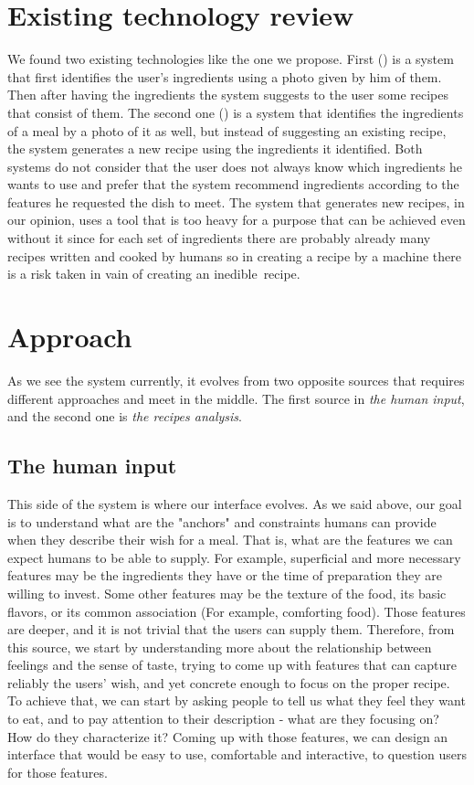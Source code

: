 \documentclass[]{article}
\begin{document}
\section{Existing technology review}
We found two existing technologies like the one we propose. First (\cite{1}) is a system that first identifies the user's ingredients using a photo given by him of them. Then after having the ingredients the system suggests to the user some recipes that consist of them. The second one (\cite{2}) is a system that identifies the ingredients of a meal by a photo of it as well, but instead of suggesting an existing recipe, the system generates a new recipe using the ingredients it identified. Both systems do not consider that the user does not always know which ingredients he wants to use and prefer that the system recommend ingredients according to the features he requested the dish to meet. The system that generates new recipes, in our opinion, uses a tool that is too heavy for a purpose that can be achieved even without it since for each set of ingredients there are probably already many recipes written and cooked by humans so in creating a recipe by a machine there is a risk taken in vain of creating an inedible recipe.

\section{Approach}
As we see the system currently, it evolves from two opposite sources that requires different approaches and meet in the middle. The first source in \textit{the human input}, and the second one is \textit{the recipes analysis}.
\subsection{The human input}
This side of the system is where our interface evolves. As we said above, our goal is to understand what are the "anchors" and constraints humans can provide when they describe their wish for a meal. That is, what are the features we can expect humans to be able to supply. For example, superficial and more necessary features may be the ingredients they have or the time of preparation they are willing to invest. Some other features may be the texture of the food, its basic flavors, or its common association (For example, comforting food). Those features are deeper, and it is not trivial that the users can supply them. Therefore, from this source, we start by understanding more about the relationship between feelings and the sense of taste, trying to come up with features that can capture reliably the users' wish, and yet concrete enough to focus on the proper recipe. To achieve that, we can start by asking people to tell us what they feel they want to eat, and to pay attention to their description - what are they focusing on? How do they characterize it? Coming up with those features, we can design an interface that would be easy to use, comfortable and interactive, to question users for those features.
\end{document}
